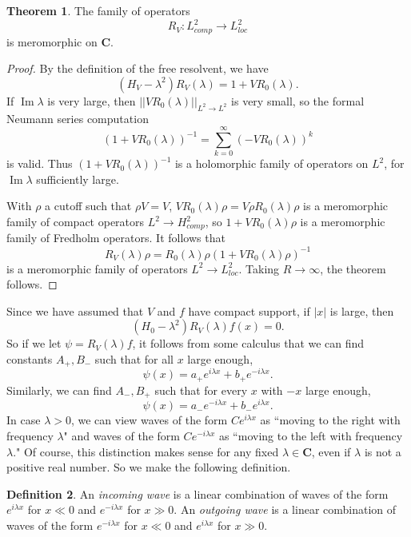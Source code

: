 \documentclass[12pt]{report}
\newcommand{\CC}{\mathbf{C}}
\newcommand{\dfn}[1]{\emph{#1}\index{#1}}
\renewcommand{\Im}{\operatorname{Im}}
\theoremstyle{definition}
\newtheorem{theorem}{Theorem}[chapter]
\newtheorem{definition}[theorem]{Definition}
\begin{document}
\begin{theorem}
\label{meromorphic continuation with compact support}
The family of operators
$$R_V: L^2_{comp} \to L^2_{loc}$$
is meromorphic on $\CC$.
\end{theorem}
\begin{proof}
By the definition of the free resolvent, we have
$$(H_V - \lambda^2)R_V(\lambda) = 1 + VR_0(\lambda).$$
If $\Im \lambda$ is very large, then $||VR_0(\lambda)||_{L^2 \to L^2}$ is very small, so the formal Neumann series computation
$$(1 + VR_0(\lambda))^{-1} = \sum_{k=0}^\infty (-VR_0(\lambda))^k$$
is valid. Thus $(1 + VR_0(\lambda))^{-1}$ is a holomorphic family of operators on $L^2$, for $\Im \lambda$ sufficiently large.

With $\rho$ a cutoff such that $\rho V = V$, $VR_0(\lambda)\rho = V\rho R_0(\lambda)\rho$ is a meromorphic family of compact operators $L^2 \to H^2_{comp}$, so $1 + VR_0(\lambda)\rho$ is a meromorphic family of Fredholm operators. It follows that
$$R_V(\lambda)\rho = R_0(\lambda)\rho(1 + VR_0(\lambda)\rho)^{-1}$$ is a meromorphic family of operators $L^2 \to L^2_{loc}$. Taking $R \to \infty$, the theorem follows.
\end{proof}

Since we have assumed that $V$ and $f$ have compact support, if $|x|$ is large, then
$$(H_0 - \lambda^2)R_V(\lambda)f(x) = 0.$$
So if we let $\psi = R_V(\lambda)f$, it follows from some calculus that we can find constants $A_+, B_-$ such that for all $x$ large enough,
$$\psi(x) = a_+e^{i\lambda x} + b_+e^{-i\lambda x}.$$
Similarly, we can find $A_-, B_+$ such that for every $x$ with $-x$ large enough,
$$\psi(x) = a_-e^{-i\lambda x} + b_-e^{i\lambda x}.$$
In case $\lambda > 0$, we can view waves of the form $C e^{i\lambda x}$ as ``moving to the right with frequency $\lambda$" and waves of the form $C e^{-i\lambda x}$ as ``moving to the left with frequency $\lambda$." Of course, this distinction makes sense for any fixed $\lambda \in \CC$, even if $\lambda$ is not a positive real number. So we make the following definition.
\begin{definition}
An \dfn{incoming wave} is a linear combination of waves of the form $e^{i\lambda x}$ for $x \ll 0$ and $e^{-i\lambda x}$ for $x \gg 0$. An \dfn{outgoing wave} is a linear combination of waves of the form $e^{-i\lambda x}$ for $x \ll 0$ and $e^{i\lambda x}$ for $x \gg 0$.
\end{definition}
\end{document}
